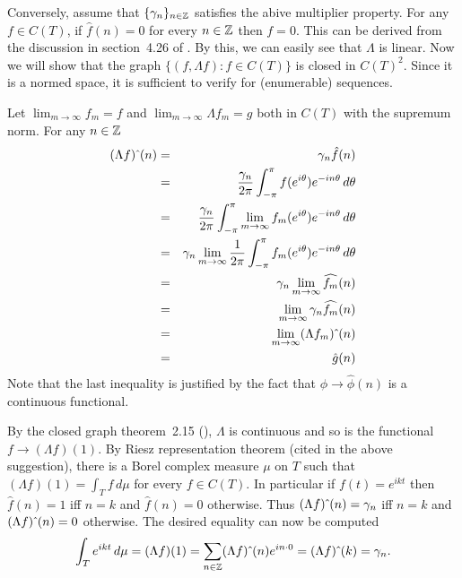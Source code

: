 \begin{enumerate}
Conversely,
assume that \(\{\gamma_n\}_{n\in\mathbb{Z}}\) satisfies the abive multiplier property.
For any \(f\in C(T)\), if \(\hat{f}(n) = 0\) for every \(n\in\mathbb{Z}\)
then \(f=0\). 
This can be derived from the discussion in section~4.26 of \cite{RudinRCA80}.
By this, we can easily see that \(\Lambda\) is linear.
Now we will show that the graph \(\{(f,\Lambda f): f\in C(T)\}\)
is closed in \(C(T)^2\).
Since it is a normed space, it is sufficient to verify
for (enumerable) sequences.
\iffalse
Every \(f\in C(T)\) satisfies
\begin{equation*}
f(t) = \sum{n\in\Z} \hat{f}(n)e^{int}
\end{equation*}
\fi
Let \(\lim_{m\to\infty} f_m = f\)
and \(\lim_{m\to\infty} \Lambda f_m = g\)
both in \(C(T)\) with the supremum norm.
For any \(n\in\mathbb{Z}\)
\begin{eqnarray*}
 (\Lambda f){\,\hat{}\,}(n) 
 &=& \gamma_n \hat{f}(n) \\
 &=& \frac{\gamma_n}{2\pi}%
     \int_{-\pi}^{\pi} f(e^{i\theta})e^{-in\theta}\,d\theta \\
 &=&  \frac{\gamma_n}{2\pi} \int_{-\pi}^{\pi}
       \lim_{m\to\infty} f_m(e^{i\theta})e^{-in\theta}\,d\theta \\
 &=& \gamma_n\lim_{m\to\infty}\frac{1}{2\pi}%
     \int_{-\pi}^{\pi} f_m(e^{i\theta})e^{-in\theta}\,d\theta \\
 &=& \gamma_n\lim_{m\to\infty} \widehat{f_m}(n) \\
 &=& \lim_{m\to\infty} \gamma_n \widehat{f_m}(n) \\
 &=& \lim_{m\to\infty} \posthat{(\Lambda {f_m})}(n) \\
 &=& \hat{g}(n)
\end{eqnarray*}
Note that the last inequality is justified by the fact that 
\(\phi \to \hat{\phi}(n)\) is a continuous functional.

By the closed graph theorem~2.15 (\cite{RudinFA79}), \(\Lambda\)
is continuous and so is the functional \(f \to (\Lambda f)(1)\).
By Riesz representation theorem (cited in the above suggestion),
there is a Borel complex measure \(\mu\) on $T$
such that \((\Lambda f)(1) = \int_T f\,d\mu\) for every \(f\in C(T)\).
In particular if \(f(t) = e^{ikt}\) then 
\(\hat{f}(n) = 1\) iff \(n=k\) and 
\(\hat{f}(n) = 0\) otherwise. 
Thus \((\Lambda f){\,\hat{}\,}(n) = \gamma_n\) iff \(n=k\) and 
\((\Lambda f){\,\hat{}\,}(n) = 0\) otherwise.
The desired equality can now be computed
\begin{equation*}
\int_T e^{ikt}\,d\mu
 = (\Lambda f)(1)
 = \sum_{n\in\mathbb{Z}} (\Lambda f){\,\hat{}\,}(n) e^{in\cdot 0}
 = (\Lambda f){\,\hat{}\,}(k)
 = \gamma_n.
\end{equation*}



\end{enumerate}
